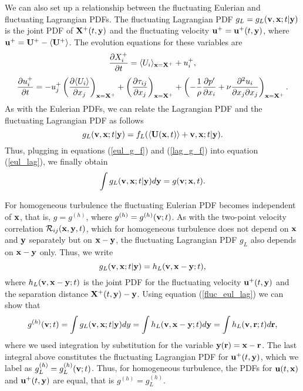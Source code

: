 \documentclass[oneside,a4paper,11pt]{report}
\newcommand{\pfluc}{p'}
\newcommand{\rs}{\tau}          %
\newcommand{\tpvc}{\mathcal{R}} %
\newcommand{\uiavg}{\langle U_i \rangle}
\newcommand{\uifluc}{u_i}
\newcommand{\ujfluc}{u_j}
\begin{document}
We can also set up a relationship between the fluctuating Eulerian and fluctuating Lagrangian PDFs. The fluctuating Lagrangian PDF $g_L = g_L(\mathbf{v}, \mathbf{x}; t|\mathbf{y})$ is the joint PDF of $\bold{X}^+(t,\mathbf{y})$ and the fluctuating velocity $\mathbf{u}^+ = \mathbf{u}^+(t,\mathbf{y})$, where $\mathbf{u}^+ = \mathbf{U}^+ - \langle  \mathbf{U}^+ \rangle$. The evolution equations for these variables are
\begin{equation}
\frac{\partial X_i^+}{\partial t} = \uiavg_{\xvec = \Xvec^+} + \uifluc^+ ,
\end{equation}
\begin{equation}
\frac{\partial \uifluc^+}{\partial t} = -\ujfluc^+ \left ( \frac{\partial \uiavg}{\partial x_j} \right)_{\xvec = \Xvec^+} + \left ( \frac{\partial \rs_{ij}}{\partial x_j} \right )_{\xvec = \Xvec^+} + \left ( - \frac{1}{\rho} \frac{\partial \pfluc}{\partial x_i} + \nu \frac{\partial^2 \uifluc}{\partial x_j \partial x_j} \right)_{\xvec = \Xvec^+}.
\end{equation}
As with the Eulerian PDFs, we can relate the Lagrangian PDF and the fluctuating Lagrangian PDF as follows
\begin{equation}
\label{lag_g_f}
g_L(\mathbf{v},\mathbf{x}; t|\mathbf{y}) = f_L(\langle \mathbf{U}(\mathbf{x},t) \rangle + \mathbf{v}, \mathbf{x}; t|\mathbf{y}).
\end{equation}
Thus, plugging in equations (\ref{eul_g_f}) and (\ref{lag_g_f}) into equation (\ref{eul_lag}), we finally obtain
\begin{equation}
\label{fluc_eul_lag}
\int g_L(\mathbf{v},\mathbf{x}; t|\mathbf{y}) d\mathbf{y} = g(\mathbf{v}; \mathbf{x},t).
\end{equation}

For homogeneous turbulence the fluctuating Eulerian PDF becomes independent of $\mathbf{x}$, that is, $g = g^{(h)}$, where $g^{(h)} = g^{(h)}(\mathbf{v};t)$. As with the two-point velocity correlation $\tpvc_{ij}(\xvec,\yvec,t)$, which for homogeneous turbulence does not depend on $\mathbf{x}$ and $\mathbf{y}$ separately but on $\mathbf{x} - \mathbf{y}$, the fluctuating Lagrangian PDF $g_L$  also depends on $\mathbf{x} - \mathbf{y}$ only. Thus, we write
\begin{equation}
g_L(\mathbf{v} ,\mathbf{x} ; t |\mathbf{y}) = h_L(\mathbf{v}, \mathbf{x} - \mathbf{y}; t),
\end{equation}
where $h_L(\mathbf{v}, \mathbf{x} - \mathbf{y}; t)$ is the joint PDF for the fluctuating velocity $\mathbf{u}^+(t,\mathbf{y})$ and the separation distance $\mathbf{X}^+(t,\mathbf{y}) - \mathbf{y}$. Using equation (\ref{fluc_eul_lag}) we can show that
\begin{equation}
g^{(h)}(\mathbf{v};t) =  \int g_L(\mathbf{v},\mathbf{x};t|\mathbf{y})dy = \int h_L(\mathbf{v}, \mathbf{x} - \mathbf{y}; t) d\mathbf{y} = \int h_L(\mathbf{v}, \mathbf{r};t) d\mathbf{r},
\end{equation}
where we used integration by substitution for the variable $\mathbf{y}(\mathbf{r}) = \mathbf{x} - \mathbf{r}$. The last integral above constitutes the fluctuating Lagrangian PDF for $\mathbf{u}^+(t,\mathbf{y})$, which we label as $g_L^{(h)} = g_L^{(h)}(\mathbf{v}; t)$. Thus, for homogeneous turbulence, the PDFs for $\mathbf{u}(t,\mathbf{x})$ and $\mathbf{u}^+(t,\mathbf{y})$ are equal, that is $g^{(h)} = g_L^{(h)}$.
\end{document}
